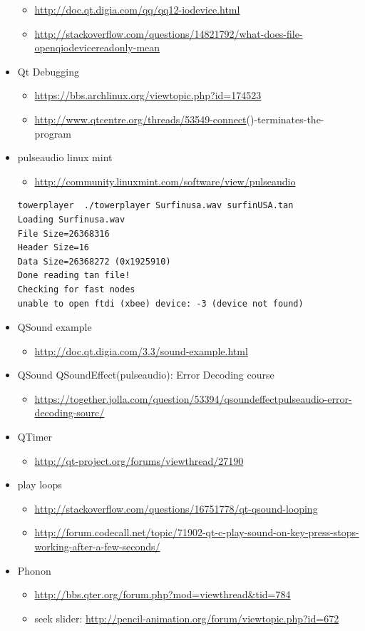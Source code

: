 \documentclass[9pt,b5paper]{article}
\begin{document}
\begin{itemize}
\begin{itemize}
\item \url{http://doc.qt.digia.com/qq/qq12-iodevice.html}
\item \url{http://stackoverflow.com/questions/14821792/what-does-file-openqiodevicereadonly-mean}
\end{itemize}
\item Qt Debugging
\begin{itemize}
\item \url{https://bbs.archlinux.org/viewtopic.php?id=174523}
\item \url{http://www.qtcentre.org/threads/53549-connect}()-terminates-the-program
\end{itemize}
\item pulseaudio linux mint
\begin{itemize}
\item \url{http://community.linuxmint.com/software/view/pulseaudio}
\end{itemize}
\begin{verbatim}
towerplayer  ./towerplayer Surfinusa.wav surfinUSA.tan
Loading Surfinusa.wav
File Size=26368316
Header Size=16
Data Size=26368272 (0x1925910)
Done reading tan file!
Checking for fast nodes
unable to open ftdi (xbee) device: -3 (device not found)
\end{verbatim}
\item QSound example
\begin{itemize}
\item \url{http://doc.qt.digia.com/3.3/sound-example.html}
\end{itemize}
\item QSound QSoundEffect(pulseaudio): Error Decoding course  
\begin{itemize}
\item \url{https://together.jolla.com/question/53394/qsoundeffectpulseaudio-error-decoding-sourc/}
\end{itemize}
\item QTimer
\begin{itemize}
\item \url{http://qt-project.org/forums/viewthread/27190}
\end{itemize}
\item play loops
\begin{itemize}
\item \url{http://stackoverflow.com/questions/16751778/qt-qsound-looping}
\item \url{http://forum.codecall.net/topic/71902-qt-c-play-sound-on-key-press-stops-working-after-a-few-seconds/}
\end{itemize}
\item Phonon
\begin{itemize}
\item \url{http://bbs.qter.org/forum.php?mod=viewthread&tid=784}
\item seek slider: \url{http://pencil-animation.org/forum/viewtopic.php?id=672}
\end{itemize}
\end{itemize}
\end{document}

